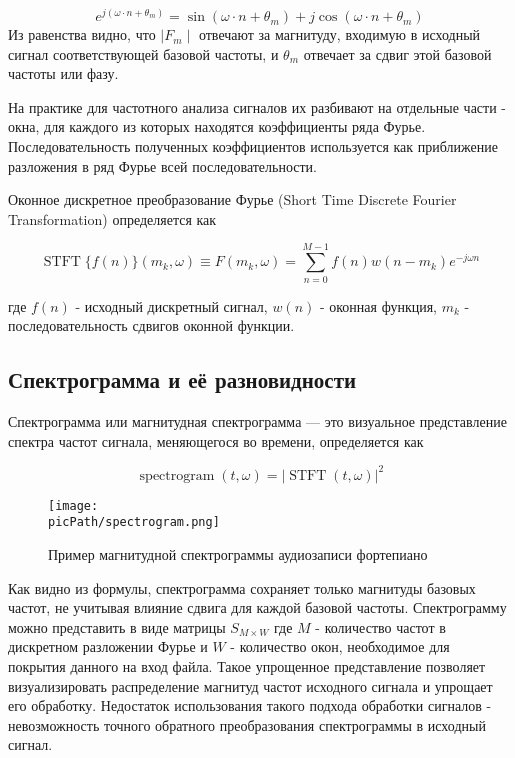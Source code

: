 \documentclass[oneside,final,14pt]{extreport}
\newcommand{\picPath}{pictures}
\begin{document}
$$
e^{j(\omega \cdot n + \theta_m)} = \sin(\omega \cdot n + \theta_m) + j\cos(\omega \cdot n + \theta_m)
$$
Из равенства видно, что $\mid F_m \mid$ отвечают за магнитуду, входимую в исходный сигнал соответствующей базовой частоты, и $\theta_m$ отвечает за сдвиг этой базовой частоты или фазу.

На практике для частотного анализа сигналов их разбивают на отдельные части - окна, для каждого из которых находятся коэффициенты ряда Фурье. Последовательность полученных коэффициентов используется как приближение разложения в ряд Фурье всей последовательности. 

Оконное дискретное преобразование Фурье (Short Time Discrete Fourier Transformation)\cite{bib:bio_signals_and_image_proc} определяется как 

$$
\begin{equation}
\operatorname{STFT}\{f(n)\}(m_k, \omega) \equiv F(m_k, \omega)=\sum_{n=0}^{M-1} f(n) w(n-m_k) e^{-j \omega n}
\end{equation}
$$

где $f(n)$ - исходный дискретный сигнал, $w(n)$ - оконная функция, $m_k$ - последовательность сдвигов оконной функции.

\subsection{Спектрограмма и её разновидности}
\label{chap:spectrogram}
Спектрограмма или магнитудная спектрограмма — это визуальное представление спектра частот сигнала, меняющегося во времени\cite{bib:think_DSP}, определяется как 

$$
\begin{equation}
\operatorname{spectrogram}(t, \omega)=|\operatorname{STFT}(t, \omega)|^{2}
\end{equation}
$$


\begin{figure}[H]
\begin{center}
\texttt{[image: \\picPath/spectrogram.png]}
\end{center}
  \caption{Пример магнитудной спектрограммы аудиозаписи фортепиано}
\end{figure}



Как видно из формулы, спектрограмма сохраняет только магнитуды базовых частот, не учитывая влияние сдвига для каждой базовой частоты. Спектрограмму можно представить в виде матрицы $S_{M \times W}$ где $M$ - количество частот в дискретном разложении Фурье и $W$ - количество окон, необходимое для покрытия данного на вход файла. Такое упрощенное представление позволяет визуализировать распределение магнитуд частот исходного сигнала и упрощает его обработку. Недостаток использования такого подхода обработки сигналов - невозможность точного обратного преобразования спектрограммы в исходный сигнал.
\end{document}
